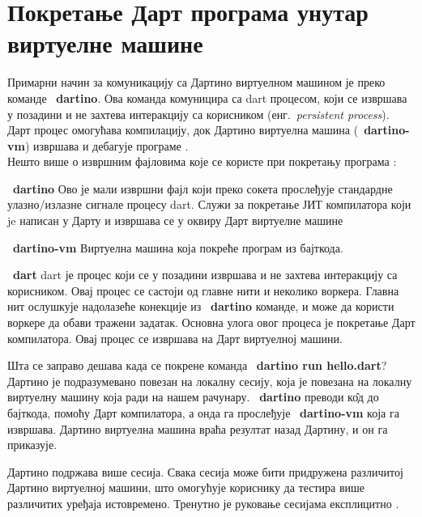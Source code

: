 \documentclass[12pt,oneside]{memoir}
\begin{document}
\section{Покретање Дарт програма унутар виртуелне машине}
\label{sec:pokretanje}

Примарни начин за комуникацију са Дартино виртуелном машином је преко команде ~\textbf{dartino}. Ова команда комуницира са dart процесом, који се извршава у позадини и не захтева интеракцију са корисником (енг.~\textit{persistent process}). Дарт процес омогућава компилацију, док Дартино виртуелна машина (~\textbf{dartino-vm}) извршава и дебагује програме .\\

Нешто више о извршним фајловима које се користе при покретању програма \cite{komande}:
\begin{description}
\item ~\textbf{dartino}
Ово је мали извршни фајл који преко сокета прослеђује стандардне улазно/излазне сигнале процесу dart. Служи за покретање ЈИТ компилатора који je написан у Дарту и извршава се у оквиру Дарт виртуелне машине
\item ~\textbf{dartino-vm} 
Виртуелна машина која покреће програм из бајткода.
\item ~\textbf{dart}
dart је процес који се у позадини извршава и не захтева интеракцију са корисником. Овај процес се састоји од главне нити и неколико воркера. Главна нит ослушкује надолазеће конекције из ~\textbf{dartino} команде, и може да користи воркере да обави тражени задатак. Основна улога овог процеса је покретање Дарт компилатора. Овај процес се извршава на Дарт виртуелној машини.
\end{description}

Шта се заправо дешава када се покрене команда ~\textbf{dartino run hello.dart}? Дартино је подразумевано повезан на локалну сесију, која је повезана на локалну виртуелну машину која ради на нашем рачунару. ~\textbf{dartino} преводи к\^{о}д до бајткода, помоћу Дарт компилатора, а онда га прослеђује ~\textbf{dartino-vm} која га извршава. Дартино виртуелна машина враћа резултат назад Дартину, и он га приказује.

Дартино подржава више сесија. Свака сесија може бити придружена различитој Дартино виртуелној машини, што омогућује кориснику да тестира више различитих уређаја истовремено. Тренутно је руковање сесијама експлицитно \cite{Dartino, komande}.
\end{document}
